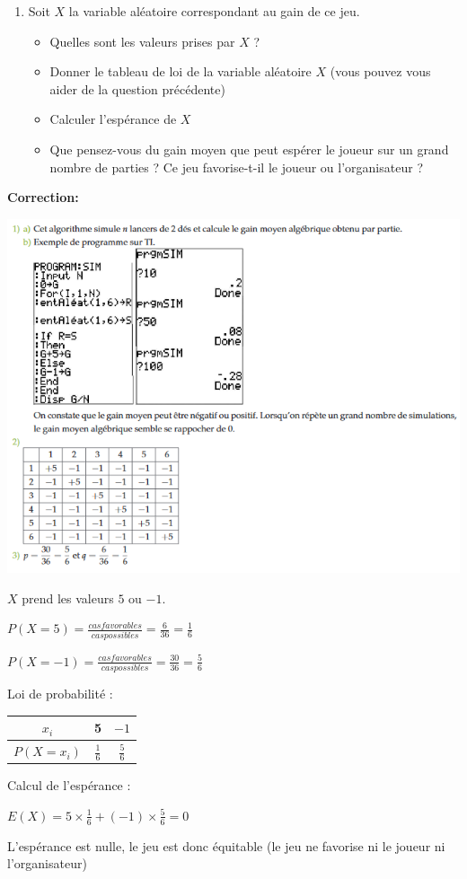 \documentclass[11pt]{cornouaille}
\begin{document}
\begin{enumerate}
 \item Soit $X$ la variable aléatoire correspondant au gain de ce jeu.
\begin{itemize}
	\item Quelles sont les valeurs prises par $X$ ?
	\item Donner le tableau de loi de la variable aléatoire $X$ (vous pouvez vous aider de la question précédente)
	\item Calculer l'espérance de $X$
	\item Que pensez-vous du gain moyen que peut esp\'{e}rer le
   joueur sur un grand nombre de parties ? Ce jeu favorise-t-il le
   joueur ou l'organisateur ?
\end{itemize}

 \end{enumerate}


\bigskip

{\color{red}

\textbf{Correction:}

\begin{center}
	\includegraphics[scale=0.9]{algo1.png}
\end{center}

$X$ prend les valeurs $5$ ou $-1$.

$P(X=5)=\frac{cas favorables}{cas possibles}=\frac{6}{36}=\frac{1}{6}$

$P(X=-1)=\frac{cas favorables}{cas possibles}=\frac{30}{36}=\frac{5}{6}$


Loi de probabilité :

\begin{center}
	\begin{tabular}{|c|c|c|}
	\hline
	$x_i$ & 5 & $-1$ \\
	\hline
	$P(X=x_i)$ & $\frac{1}{6}$ & $\frac{5}{6}$ \\
	\hline
	
	\end{tabular}
\end{center}

Calcul de l'espérance :

$E(X)=5 \times \frac{1}{6}+(-1) \times \frac{5}{6}=0$

L'espérance est nulle, le jeu est donc équitable (le jeu ne favorise ni le joueur ni l'organisateur)
}
\end{document}

